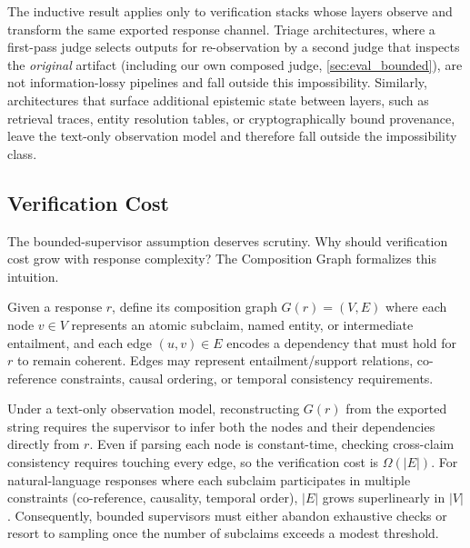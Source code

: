 \begin{remark}
The inductive result applies only to verification stacks whose layers observe
and transform the same exported response channel. Triage architectures, where
a first-pass judge selects outputs for re-observation by a second judge that
inspects the \emph{original} artifact (including our own composed judge,
\autoref{sec:eval_bounded}), are not information-lossy pipelines and fall
outside this impossibility. Similarly, architectures that surface additional
epistemic state between layers, such as retrieval traces, entity resolution
tables, or cryptographically bound provenance, leave the text-only observation
model and therefore fall outside the impossibility class.
\end{remark}

\subsection{Verification Cost}

The bounded-supervisor assumption deserves scrutiny. Why should verification
cost grow with response complexity? The Composition Graph formalizes this
intuition.

\begin{definition}
Given a response $r$, define its composition graph $G(r) = (V, E)$ where each
node $v \in V$ represents an atomic subclaim, named entity, or intermediate
entailment, and each edge $(u, v) \in E$ encodes a dependency that must hold for
$r$ to remain coherent. Edges may represent entailment/support relations,
co-reference constraints, causal ordering, or temporal consistency requirements.
\end{definition}

\begin{lemma}\label{lem:superlinear}
Under a text-only observation model, reconstructing $G(r)$ from the exported
string requires the supervisor to infer both the nodes and their dependencies
directly from $r$. Even if parsing each node is constant-time, checking
cross-claim consistency requires touching every edge, so the verification cost
is $\Omega(|E|)$. For natural-language responses where each subclaim
participates in multiple constraints (co-reference, causality, temporal order),
$|E|$ grows superlinearly in $|V|$. Consequently, bounded supervisors must
either abandon exhaustive checks or resort to sampling once the number of
subclaims exceeds a modest threshold.
\end{lemma}

